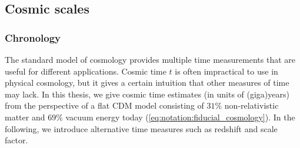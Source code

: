 \subsection{Cosmic scales}





    \subsubsection{Chronology}
    The standard model of cosmology provides multiple time measurements that are useful for different applications. 
    Cosmic time $t$ is often impractical to use in physical cosmology, but it gives a certain intuition that other measures of time may lack. In this thesis, we give cosmic time estimates (in units of (giga)years) from the perspective of a flat \textLambda{}CDM model consisting of $31\%$ non-relativistic matter and $69\%$ vacuum energy today (\cref{eq:notation:fiducial_cosmology}). In the following, we introduce alternative time measures such as redshift and scale factor.

